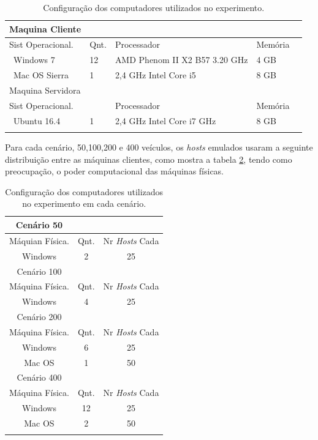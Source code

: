 \documentclass[
	12pt,				%
	oneside,			%
	a4paper,			%
	english,			%
	brazil				%
	]{abntex2ppgsi}
\begin{document}
\begin{longtable}{ |p{} |p{}  |p{}   |p{} | p{}} 
	\hline
	\rowcolor[gray]{0.7}
	 Maquina Cliente &	& 	&  \\ \hline
	\rowcolor[gray]{0.7}
	Sist Operacional.	& Qnt. & Processador	& Memória \\ \
	Windows 7	& 12 & AMD Phenom II X2 B57 3.20 GHz & 4 GB	\\ \
	Mac OS Sierra	& 1 & 2,4 GHz Intel Core i5	& 8 GB \\   \hline
	\rowcolor[gray]{0.7}
	 Maquina Servidora &	& 	&  \\ \hline
	\rowcolor[gray]{0.7}
	 Sist Operacional. &	& Processador	& Memória \\ \
	Ubuntu 16.4	& 1 & 2,4 GHz Intel Core i7 GHz & 8 GB	\\ \hline
	\caption{Configuração dos computadores utilizados no experimento. } 
	\label{tab:configuracaoMaquinas}
\end{longtable}

Para cada cenário, 50,100,200 e 400 veículos, os \textit{hosts} emulados usaram a seguinte distribuição entre as máquinas clientes, como mostra a tabela \ref{tab:configuracaoCenarios}, tendo como preocupação, o poder computacional das máquinas físicas.
\begin{longtable}{ |c |c |c |} 
	\hline
	\rowcolor[gray]{0.7}
	Cenário 50 &	& 	  \\ \hline
	\rowcolor[gray]{0.7}
	Máquian Física.	& Qnt. & Nr \textit{Hosts} Cada	 \\ \hline
	Windows	& 2 & 25 	\\ \hline
	\rowcolor[gray]{0.7}
	Cenário 100 &	& 	  \\ \hline
	\rowcolor[gray]{0.7}
	Máquina Física.	& Qnt. & Nr \textit{Hosts} Cada	 \\ \hline
	Windows	& 4 & 25 	\\ \hline
	\rowcolor[gray]{0.7}	
	Cenário 200 &	& 	  \\ \hline
	\rowcolor[gray]{0.7}
	Máquina Física.	& Qnt. & Nr \textit{Hosts} Cada	 \\ \hline
	Windows	& 6 & 25 	\\ \hline
	Mac OS	& 1 & 50 	\\ \hline
	\rowcolor[gray]{0.7}	
	Cenário 400 &	& 	  \\ \hline
	\rowcolor[gray]{0.7}
	Máquina Física.	& Qnt. & Nr \textit{Hosts} Cada	 \\ \hline
	Windows	& 12 & 25 	\\ \hline
	Mac OS	& 2 & 50 	\\ \hline
	\caption{Configuração dos computadores utilizados no experimento em cada cenário. } 
	\label{tab:configuracaoCenarios}
\end{longtable}
\end{document}
